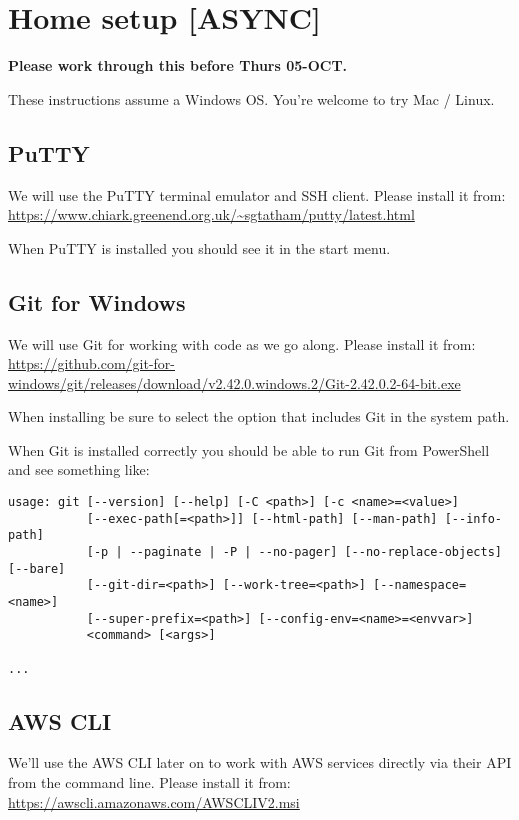 \chapter{Home setup [ASYNC]}
\label{ch:home-setup}

\textbf{Please work through this before Thurs 05-OCT.}

These instructions assume a Windows OS.
You're welcome to try Mac / Linux. 

\section{PuTTY}

We will use the PuTTY terminal emulator and SSH client.
Please install it from:\\
\url{https://www.chiark.greenend.org.uk/~sgtatham/putty/latest.html}

When PuTTY is installed you should see it in the start menu.

\section{Git for Windows}

We will use Git for working with code as we go along.
Please install it from: \\
\url{https://github.com/git-for-windows/git/releases/download/v2.42.0.windows.2/Git-2.42.0.2-64-bit.exe}

When installing be sure to select the option that includes Git in the system path.

When Git is installed correctly you should be able to run Git from PowerShell and see something like: 
\begin{verbatim}
usage: git [--version] [--help] [-C <path>] [-c <name>=<value>]
           [--exec-path[=<path>]] [--html-path] [--man-path] [--info-path]
           [-p | --paginate | -P | --no-pager] [--no-replace-objects] [--bare]
           [--git-dir=<path>] [--work-tree=<path>] [--namespace=<name>]
           [--super-prefix=<path>] [--config-env=<name>=<envvar>]
           <command> [<args>]

...
\end{verbatim}

\section{AWS CLI}

We'll use the AWS CLI later on to work with AWS services directly via their API from the command line.
Please install it from:\\
\url{https://awscli.amazonaws.com/AWSCLIV2.msi}

